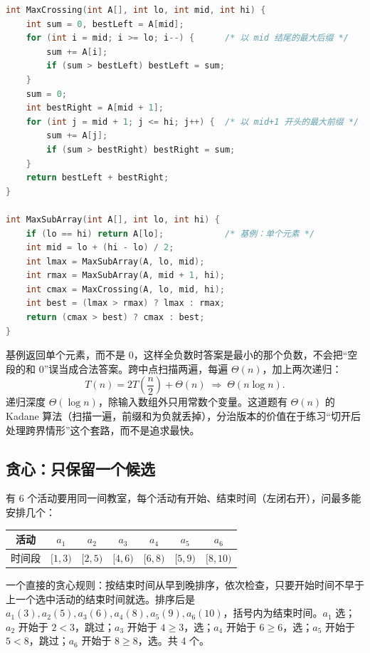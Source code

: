 \begin{lstlisting}[language=C]
int MaxCrossing(int A[], int lo, int mid, int hi) {
    int sum = 0, bestLeft = A[mid];
    for (int i = mid; i >= lo; i--) {      /* 以 mid 结尾的最大后缀 */
        sum += A[i];
        if (sum > bestLeft) bestLeft = sum;
    }
    sum = 0;
    int bestRight = A[mid + 1];
    for (int j = mid + 1; j <= hi; j++) {  /* 以 mid+1 开头的最大前缀 */
        sum += A[j];
        if (sum > bestRight) bestRight = sum;
    }
    return bestLeft + bestRight;
}

int MaxSubArray(int A[], int lo, int hi) {
    if (lo == hi) return A[lo];            /* 基例：单个元素 */
    int mid = lo + (hi - lo) / 2;
    int lmax = MaxSubArray(A, lo, mid);
    int rmax = MaxSubArray(A, mid + 1, hi);
    int cmax = MaxCrossing(A, lo, mid, hi);
    int best = (lmax > rmax) ? lmax : rmax;
    return (cmax > best) ? cmax : best;
}
\end{lstlisting}

基例返回单个元素，而不是 $0$，这样全负数时答案是最小的那个负数，不会把“空段的和 $0$”误当成合法答案。跨中点扫描两遍，每遍 $\Theta(n)$，加上两次递归：
\[
T(n)=2T\!\left(\frac n2\right)+\Theta(n)\;\Longrightarrow\;\Theta(n\log n).
\]
递归深度 $\Theta(\log n)$，除输入数组外只用常数个变量。这道题有 $\Theta(n)$ 的 Kadane 算法（扫描一遍，前缀和为负就丢掉），分治版本的价值在于练习“切开后处理跨界情形”这个套路，而不是追求最快。

\subsection{贪心：只保留一个候选}

有 6 个活动要用同一间教室，每个活动有开始、结束时间（左闭右开），问最多能安排几个：

\begin{center}
\begin{tabular}{c|cccccc}
\hline
活动 & $a_1$ & $a_2$ & $a_3$ & $a_4$ & $a_5$ & $a_6$\\
\hline
时间段 & $[1,3)$ & $[2,5)$ & $[4,6)$ & $[6,8)$ & $[5,9)$ & $[8,10)$\\
\hline
\end{tabular}
\end{center}

一个直接的贪心规则：按结束时间从早到晚排序，依次检查，只要开始时间不早于上一个选中活动的结束时间就选。排序后是 $a_1(3),a_2(5),a_3(6),a_4(8),a_5(9),a_6(10)$，括号内为结束时间。$a_1$ 选；$a_2$ 开始于 $2<3$，跳过；$a_3$ 开始于 $4\ge 3$，选；$a_4$ 开始于 $6\ge 6$，选；$a_5$ 开始于 $5<8$，跳过；$a_6$ 开始于 $8\ge 8$，选。共 4 个。

